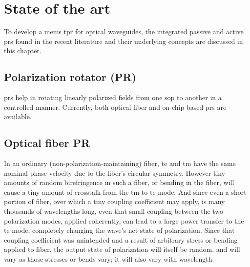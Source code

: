 \documentclass[../report.tex]{subfiles}
\begin{document}
	
	
\chapter{State of the art}
To develop a \gls{mems} \gls{tpr} for optical waveguides, the integrated passive and active \gls{pr}s found in the recent literature and their underlying concepts are discussed in this chapter. 
			
	\section{Polarization rotator (PR)}	
\gls{pr}s help in rotating linearly polarized fields from one \gls{sop} to another in a controlled manner. Currently, both optical fiber and on-chip based \gls{pr}s are available. 	

	\section{Optical fiber PR}	
In an ordinary (non-polarization-maintaining) fiber, \gls{te} and \gls{tm} have the same nominal phase velocity due to the fiber's circular symmetry. However tiny amounts of random birefringence in such a fiber, or bending in the fiber, will cause a tiny amount of crosstalk from the \gls{tm} to \gls{te} mode. And since even a short portion of fiber, over which a tiny coupling coefficient may apply, is many thousands of wavelengths long, even that small coupling between the two polarization modes, applied coherently, can lead to a large power transfer to the \gls{te} mode, completely changing the wave's net state of polarization. Since that coupling coefficient was unintended and a result of arbitrary stress or bending applied to fiber, the output state of polarization will itself be random, and will vary as those stresses or bends vary; it will also vary with wavelength.\par
\end{document}

